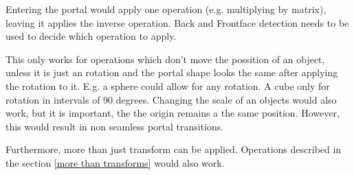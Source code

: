 Entering the portal would apply one operation (e.g. multiplying by matrix), leaving it applies the inverse operation. Back and Frontface detection needs to be used to decide which operation to apply.


This only works for operations which don't move the possition of an object, unless it is just an rotation and the portal shape looks the same after applying the rotation to it. E.g. a sphere could allow for any rotation. A cube only for rotation in intervals of 90 degrees.
Changing the scale of an objects would also work, but it is important, the the origin remains a the same position. However, this would result in non seamless portal transitions.

Furthermore, more than just transform can be applied. Operations described in the section \ref{more than transforms} would also work.












